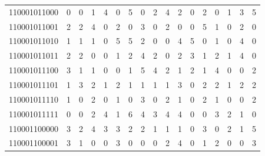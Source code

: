 \documentclass[10pt,a4paper]{article}
\begin{document}
\begin{longtable}{ |c|c|c|c|c|c|c|c|c|c|c|c|c|c|c|c|c| }
    110001011000              & 0                            & 0                                & 1                            & 4                              & 0   & 5   & 0   & 2   & 4   & 2   & 0   & 2   & 0   & 1   & 3   & 5   \\
    110001011001              & 2                            & 2                                & 4                            & 0                              & 2   & 0   & 3   & 0   & 2   & 0   & 0   & 5   & 1   & 0   & 2   & 0   \\
    110001011010              & 1                            & 1                                & 1                            & 0                              & 5   & 5   & 2   & 0   & 0   & 4   & 5   & 0   & 1   & 0   & 4   & 0   \\
    110001011011              & 2                            & 2                                & 0                            & 0                              & 1   & 2   & 4   & 2   & 0   & 2   & 3   & 1   & 2   & 1   & 4   & 0   \\
    110001011100              & 3                            & 1                                & 1                            & 0                              & 0   & 1   & 5   & 4   & 2   & 1   & 2   & 1   & 4   & 0   & 0   & 2   \\
    110001011101              & 1                            & 3                                & 2                            & 1                              & 2   & 1   & 1   & 1   & 1   & 3   & 0   & 2   & 2   & 1   & 2   & 2   \\
    110001011110              & 1                            & 0                                & 2                            & 0                              & 1   & 0   & 3   & 0   & 2   & 1   & 0   & 2   & 1   & 0   & 0   & 2   \\
    110001011111              & 0                            & 0                                & 2                            & 4                              & 1   & 6   & 4   & 3   & 4   & 4   & 0   & 0   & 3   & 2   & 1   & 0   \\
    110001100000              & 3                            & 2                                & 4                            & 3                              & 3   & 2   & 2   & 1   & 1   & 1   & 0   & 3   & 0   & 2   & 1   & 5   \\
    110001100001              & 3                            & 1                                & 0                            & 0                              & 3   & 0   & 0   & 0   & 2   & 4   & 0   & 1   & 2   & 0   & 0   & 3   \\

\end{longtable}
\end{document}
